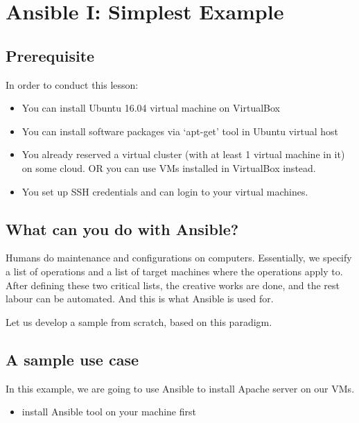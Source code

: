 \section{Ansible I: Simplest Example}\label{ansible-i-simplest-example}

\subsection{Prerequisite}\label{prerequisite}

In order to conduct this lesson:

\begin{itemize}
\item
  You can install Ubuntu 16.04 virtual machine on VirtualBox
\item
  You can install software packages via `apt-get' tool in Ubuntu virtual
  host
\item
  You already reserved a virtual cluster (with at least 1 virtual
  machine in it) on some cloud. OR you can use VMs installed in
  VirtualBox instead.
\item
  You set up SSH credentials and can login to your virtual machines.
\end{itemize}

\subsection{What can you do with
Ansible?}\label{what-can-you-do-with-ansible}

Humans do maintenance and configurations on computers. Essentially, we
specify a list of operations and a list of target machines where the
operations apply to. After defining these two critical lists, the
creative works are done, and the rest labour can be automated. And this
is what Ansible is used for.

Let us develop a sample from scratch, based on this paradigm.

\subsection{A sample use case}\label{a-sample-use-case}

In this example, we are going to use Ansible to install Apache server on
our VMs.

\begin{itemize}

\item
  install Ansible tool on your machine first
\end{itemize}

